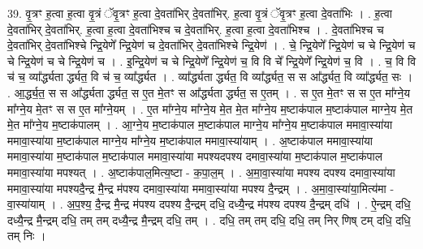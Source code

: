 \documentclass[17pt]{extarticle}
\begin{document}
39. वृ॒त्रꣳ ह॒त्वा ह॒त्वा वृ॒त्रं ॅवृ॒त्रꣳ ह॒त्वा दे॒वता॑भिर् दे॒वता॑भिर्. ह॒त्वा वृ॒त्रं ॅवृ॒त्रꣳ ह॒त्वा दे॒वता॑भिः । . ह॒त्वा दे॒वता॑भिर् दे॒वता॑भिर्. ह॒त्वा ह॒त्वा दे॒वता॑भिश्च च दे॒वता॑भिर्. ह॒त्वा ह॒त्वा दे॒वता॑भिश्च । . दे॒वता॑भिश्च च दे॒वता॑भिर् दे॒वता॑भिश्चे न्द्रि॒येणे᳚ न्द्रि॒येण॑ च दे॒वता॑भिर् दे॒वता॑भिश्चे न्द्रि॒येण॑ । . चे॒ न्द्रि॒येणे᳚ न्द्रि॒येण॑ च चे न्द्रि॒येण॑ च चे न्द्रि॒येण॑ च चे न्द्रि॒येण॑ च । . इ॒न्द्रि॒येण॑ च चे न्द्रि॒येणे᳚ न्द्रि॒येण॑ च॒ वि वि चे᳚ न्द्रि॒येणे᳚ न्द्रि॒येण॑ च॒ वि । . च॒ वि वि च॑ च॒ व्या᳚र्द्ध्यता र्द्ध्यत॒ वि च॑ च॒ व्या᳚र्द्ध्यत । . व्या᳚र्द्ध्यता र्द्ध्यत॒ वि व्या᳚र्द्ध्यत॒ स स आ᳚र्द्ध्यत॒ वि व्या᳚र्द्ध्यत॒ सः । . आ॒र्द्ध्य॒त॒ स स आ᳚र्द्ध्यता र्द्ध्यत॒ स ए॒त मे॒तꣳ स आ᳚र्द्ध्यता र्द्ध्यत॒ स ए॒तम् । . स ए॒त मे॒तꣳ स स ए॒त मा᳚ग्ने॒य मा᳚ग्ने॒य मे॒तꣳ स स ए॒त मा᳚ग्ने॒यम् । . ए॒त मा᳚ग्ने॒य मा᳚ग्ने॒य मे॒त मे॒त मा᳚ग्ने॒य म॒ष्टाक॑पाल म॒ष्टाक॑पाल माग्ने॒य मे॒त मे॒त मा᳚ग्ने॒य म॒ष्टाक॑पालम् । . आ॒ग्ने॒य म॒ष्टाक॑पाल म॒ष्टाक॑पाल माग्ने॒य मा᳚ग्ने॒य म॒ष्टाक॑पाल ममावा॒स्या॑या ममावा॒स्या॑या म॒ष्टाक॑पाल माग्ने॒य मा᳚ग्ने॒य म॒ष्टाक॑पाल ममावा॒स्या॑याम् । . अ॒ष्टाक॑पाल ममावा॒स्या॑या ममावा॒स्या॑या म॒ष्टाक॑पाल म॒ष्टाक॑पाल ममावा॒स्या॑या मपश्यदपश्य दमावा॒स्या॑या म॒ष्टाक॑पाल म॒ष्टाक॑पाल ममावा॒स्या॑या मपश्यत् । . अ॒ष्टाक॑पाल॒मित्य॒ष्टा - क॒पा॒ल॒म् । . अ॒मा॒वा॒स्या॑या मपश्य दपश्य दमावा॒स्या॑या ममावा॒स्या॑या मपश्यदै॒न्द्र मै॒न्द्र म॑पश्य दमावा॒स्या॑या ममावा॒स्या॑या मपश्य दै॒न्द्रम् । . अ॒मा॒वा॒स्या॑या॒मित्य॑मा - वा॒स्या॑याम् । . अ॒प॒श्य॒ दै॒न्द्र मै॒न्द्र म॑पश्य दपश्य दै॒न्द्रम् दधि॒ दध्यै॒न्द्र म॑पश्य दपश्य दै॒न्द्रम् दधि॑ । . ऐ॒न्द्रम् दधि॒ दध्यै॒न्द्र मै॒न्द्रम् दधि॒ तम् तम् दध्यै॒न्द्र मै॒न्द्रम् दधि॒ तम् । . दधि॒ तम् तम् दधि॒ दधि॒ तम् निर् णिष् टम् दधि॒ दधि॒ तम् निः । \newline
\pagebreak
{}
\end{document}
